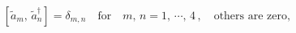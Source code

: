 \begin{equation}
\left[ \tilde{a}_{m},\,\tilde{a}_{n}^{\dagger}\right] = \delta_{m,n}\quad 
\textrm{for}\quad m,\,n =1,\,\cdots,\,4\,,\quad 
\textrm{others are zero},\label{eq:4.1.15}
\end{equation}

